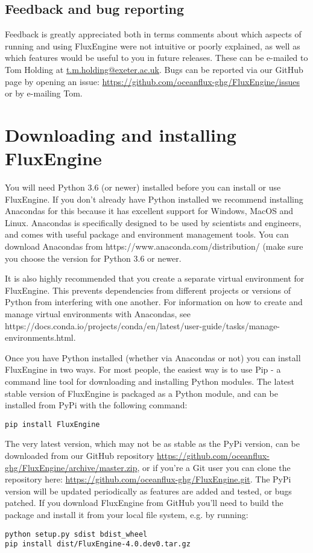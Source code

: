 \documentclass[]{scrartcl}
\begin{document}
\subsection{Feedback and bug reporting} \label{feedback}
Feedback is greatly appreciated both in terms comments about which aspects of running and using FluxEngine were not intuitive or poorly explained, as well as which features would be useful to you in future releases. These can be e-mailed to Tom Holding at \url{t.m.holding@exeter.ac.uk}. Bugs can be reported via our GitHub page by opening an issue: \url{https://github.com/oceanflux-ghg/FluxEngine/issues} or by e-mailing Tom.


\section{Downloading and installing FluxEngine}
You will need Python 3.6 (or newer) installed before you can install or use FluxEngine. If you don't already have Python installed we recommend installing Anacondas for this because it has excellent support for Windows, MacOS and Linux. Anacondas is specifically designed to be used by scientists and engineers, and comes with useful package and environment management tools. You can download Anacondas from {https://www.anaconda.com/distribution/} (make sure you choose the version for Python 3.6 or newer.

It is also highly recommended that you create a separate virtual environment for FluxEngine. This prevents dependencies from different projects or versions of Python from interfering with one another. For information on how to create and manage virtual environments with Anacondas, see {https://docs.conda.io/projects/conda/en/latest/user-guide/tasks/manage-environments.html}.

Once you have Python installed (whether via Anacondas or not) you can install FluxEngine in two ways. For most people, the easiest way is to use Pip - a command line tool for downloading and installing Python modules. The latest stable version of FluxEngine is packaged as a Python module, and can be installed from PyPi with the following command:
\begin{lstlisting}
pip install FluxEngine
\end{lstlisting}

The very latest version, which may not be as stable as the PyPi version, can be downloaded from our GitHub repository \url{https://github.com/oceanflux-ghg/FluxEngine/archive/master.zip}, or if you're a Git user you can clone the repository here: \url{https://github.com/oceanflux-ghg/FluxEngine.git}. The PyPi version will be updated periodically as features are added and tested, or bugs patched. If you download FluxEngine from GitHub you'll need to build the package and install it from your local file system, e.g. by running:
\begin{lstlisting}
python setup.py sdist bdist_wheel
pip install dist/FluxEngine-4.0.dev0.tar.gz
\end{lstlisting}
\end{document}
